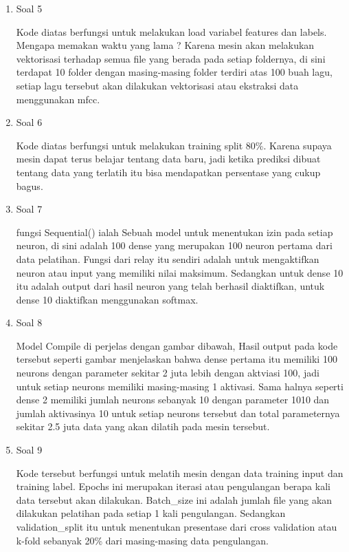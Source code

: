 \begin{enumerate}
	\item Soal 5
	\hfill\break
	
	Kode diatas berfungsi untuk melakukan load variabel features dan labels. Mengapa memakan waktu yang lama ? Karena mesin akan melakukan vektorisasi terhadap semua file yang berada pada setiap foldernya, di sini terdapat 10 folder dengan masing-masing folder terdiri atas 100 buah lagu, setiap lagu tersebut akan dilakukan vektorisasi atau ekstraksi data menggunakan mfcc.


	\item Soal 6
	\hfill\break
	
	Kode diatas berfungsi untuk melakukan training split 80\%. Karena supaya mesin dapat terus belajar tentang data baru, jadi ketika prediksi dibuat tentang data yang terlatih itu bisa mendapatkan persentase yang cukup bagus. 
	\item Soal 7
	\hfill\break
	
	fungsi Sequential() ialah Sebuah model untuk menentukan izin pada setiap neuron, di sini adalah 100 dense yang merupakan 100 neuron pertama dari data pelatihan. Fungsi dari relay itu sendiri adalah untuk mengaktifkan neuron atau input yang memiliki nilai maksimum. Sedangkan untuk dense 10 itu adalah output dari hasil neuron yang telah berhasil diaktifkan, untuk dense 10 diaktifkan menggunakan softmax. 
	\item Soal 8
	\hfill\break
	
	Model Compile di perjelas dengan gambar dibawah, Hasil output pada kode tersebut seperti gambar  menjelaskan bahwa dense pertama itu memiliki 100 neurons dengan parameter sekitar 2 juta lebih dengan aktviasi 100, jadi untuk setiap neurons memiliki masing-masing 1 aktivasi. Sama halnya seperti dense 2 memiliki jumlah neurons sebanyak 10 dengan parameter 1010 dan jumlah aktivasinya 10 untuk setiap neurons tersebut dan total parameternya sekitar 2.5 juta data yang akan dilatih pada mesin tersebut.
	

	\item Soal 9
	\hfill\break
	
	Kode tersebut berfungsi untuk melatih mesin dengan data training input dan training label. Epochs ini merupakan iterasi atau pengulangan berapa kali data tersebut akan dilakukan. Batch\_size ini adalah jumlah file yang akan dilakukan pelatihan pada setiap 1 kali pengulangan. Sedangkan validation\_split itu untuk menentukan presentase dari cross validation atau k-fold sebanyak 20\% dari masing-masing data pengulangan.


\end{enumerate}
